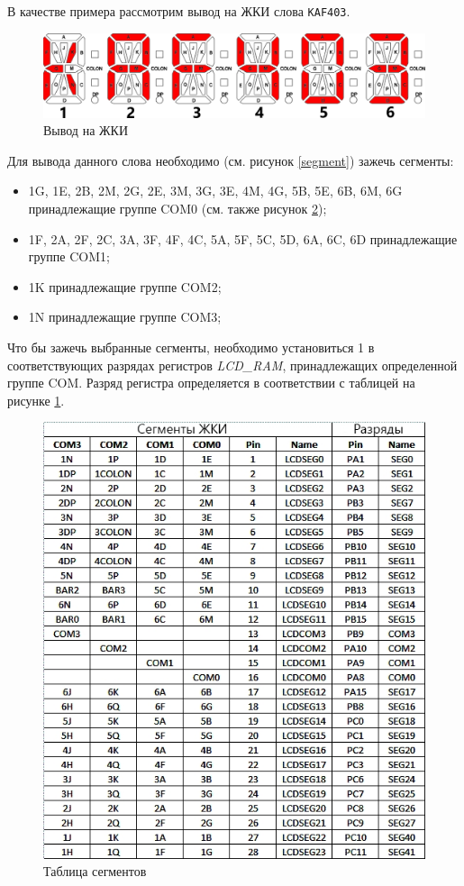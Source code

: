 В качестве примера рассмотрим вывод на ЖКИ слова \verb#KAF403#.
\begin{figure}[H]
\begin{center}
\includegraphics[scale=0.33]{Image/53.jpg} 
\end{center}
\caption{Вывод на ЖКИ}\label{kaf403}
\end{figure}
Для вывода данного слова необходимо (см. рисунок \ref{segment}) зажечь сегменты: 
\begin{itemize}
\item 1G, 1E, 2B, 2M, 2G, 2E, 3M, 3G, 3E, 4M, 4G, 5B, 5E, 6B, 6M, 6G принадлежащие группе COM0 (см. также рисунок \ref{SegmentTable});
\item 1F, 2A, 2F, 2C, 3A, 3F, 4F, 4C, 5A, 5F, 5C, 5D, 6A, 6C, 6D принадлежащие группе COM1;
\item 1K принадлежащие группе COM2;
\item 1N принадлежащие группе COM3;
\end{itemize}
Что бы зажечь выбранные сегменты, необходимо установиться 1 в соответствующих разрядах регистров \textit{LCD\_RAM}, принадлежащих определенной группе COM. Разряд регистра определяется в соответствии с таблицей на рисунке \ref{kaf403}.  
\begin{figure}[H]
\begin{center}
\includegraphics[scale=0.8]{Image/54.jpg} 
\end{center}
\caption{Таблица сегментов}\label{SegmentTable}
\end{figure}
